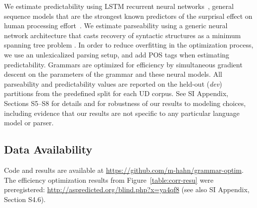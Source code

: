 \documentclass[9pt,twocolumn,twoside,lineno]{pnas-new}
\begin{document}
{We estimate predictability using LSTM recurrent neural networks~\citep{hochreiter1997long}, general sequence models that are the strongest known predictors of the surprisal effect on human processing effort~\citep{frank2011insensitivity,goodkind2018predictive}.
We estimate parseability using a generic neural network architecture that casts recovery of syntactic structures as a minimum spanning tree problem \citep{dozat2017stanford, zhang2017dependency}.
In order to reduce overfitting in the optimization process, we use an unlexicalized parsing setup, and add POS tags when estimating predictability.
Grammars are optimized for efficiency by simultaneous gradient descent on the parameters of the grammar and these neural models.
All parseability and predictability values are reported on the held-out (\emph{dev}) partitions from the predefined split for each UD corpus.
See SI Appendix, Sections S5--S8 for details and for robustness of our results to modeling choices, including evidence that our results are not specific to any particular language model or parser.

\subsection*{Data Availability}
Code and results are available at \url{https://github.com/m-hahn/grammar-optim}.
The efficiency optimization results from Figure~\ref{table:corr-resu} were preregistered: \url{ http://aspredicted.org/blind.php?x=ya4qf8} (see also SI Appendix, Section S4.6). 
}



\showmatmethods{} %


\showacknow{} %


%

\end{document}
